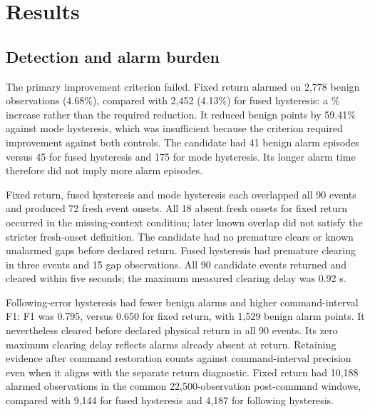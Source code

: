 \section{Results}
\subsection{Detection and alarm burden}
The primary improvement criterion failed. Fixed return alarmed on 2,778 benign observations (4.68\%), compared with 2,452 (4.13\%) for fused hysteresis: a \RelativeIncrease\% increase rather than the required reduction. It reduced benign points by 59.41\% against mode hysteresis, which was insufficient because the criterion required improvement against both controls. The candidate had 41 benign alarm episodes versus 45 for fused hysteresis and 175 for mode hysteresis. Its longer alarm time therefore did not imply more alarm episodes.

\begin{table}[htbp]\centering\small
\caption{Selected controls and candidate on the fresh pooled population. Overlap/fresh counts have denominator 90; early denotes events with premature clearing. Full roster appears in Appendix~\ref{app:all}.}
\label{tab:main}
\end{table}

Fixed return, fused hysteresis and mode hysteresis each overlapped all 90 events and produced 72 fresh event onsets. All 18 absent fresh onsets for fixed return occurred in the missing-context condition; later known overlap did not satisfy the stricter fresh-onset definition. The candidate had no premature clears or known unalarmed gaps before declared return. Fused hysteresis had premature clearing in three events and 15 gap observations. All 90 candidate events returned and cleared within five seconds; the maximum measured clearing delay was 0.92 s. 

Following-error hysteresis had fewer benign alarms and higher command-interval F1: F1 was 0.795, versus 0.650 for fixed return, with 1,529 benign alarm points. It nevertheless cleared before declared physical return in all 90 events. Its zero maximum clearing delay reflects alarms already absent at return. Retaining evidence after command restoration counts against command-interval precision even when it aligns with the separate return diagnostic. Fixed return had 10,188 alarmed observations in the common 22,500-observation post-command windows, compared with 9,144 for fused hysteresis and 4,187 for following hysteresis.

